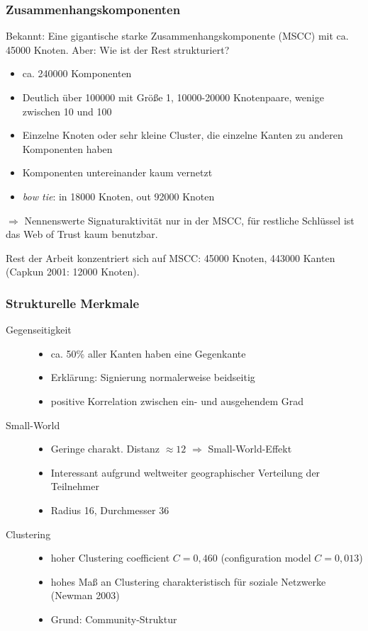 \documentclass[10pt]{beamer}
\begin{document}
\begin{frame}
  \frametitle{Zusammenhangskomponenten}
  Bekannt: Eine gigantische starke Zusammenhangskomponente (MSCC) mit
  ca. 45000 Knoten. Aber: Wie ist der Rest strukturiert?

  \begin{itemize}
  \item ca. 240000 Komponenten
  \item Deutlich \"uber 100000 mit Gr\"o{\ss}e 1, 10000-20000
    Knotenpaare, wenige zwischen 10 und 100
  \item Einzelne Knoten oder sehr kleine Cluster, die einzelne Kanten
    zu anderen Komponenten haben
  \item Komponenten untereinander kaum vernetzt
  \item \emph{bow tie}: in 18000 Knoten, out 92000 Knoten
  \end{itemize}

  $\Rightarrow$ Nennenswerte Signaturaktivit\"at nur in der MSCC,
  f\"ur restliche Schl\"ussel ist das Web of Trust kaum benutzbar.
\vspace{0.5cm}

  Rest der Arbeit konzentriert sich auf MSCC: 45000 Knoten, 443000
  Kanten (Capkun 2001: 12000 Knoten).
  
\end{frame}

\begin{frame}
  \frametitle{Strukturelle Merkmale}
  \begin{description}
  \item[Gegenseitigkeit]
    \begin{itemize}
    \item ca. 50\% aller Kanten haben eine Gegenkante 
    \item Erkl\"arung: Signierung normalerweise beidseitig
    \item positive Korrelation zwischen ein- und ausgehendem Grad
    \end{itemize}
  \item[Small-World] 
    \begin{itemize}
    \item Geringe charakt. Distanz $\approx 12$ $\Rightarrow$
      Small-World-Effekt
      \item Interessant aufgrund weltweiter geographischer Verteilung der
        Teilnehmer
      \item Radius 16, Durchmesser 36
    \end{itemize}
  \item[Clustering] 
    \begin{itemize}
    \item hoher Clustering coefficient $C = 0,460$ (configuration
      model $C = 0,013$)
    \item hohes Ma{\ss} an Clustering charakteristisch f\"ur soziale
      Netzwerke (Newman 2003)
    \item Grund: Community-Struktur
    \end{itemize}
  \end{description}
\end{frame}
\end{document}
